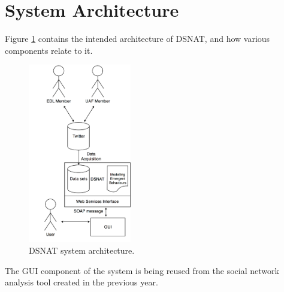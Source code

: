 \section{System Architecture}
Figure \ref{fig:system} contains the intended architecture of DSNAT, and how various components relate to it.

\begin{figure}[htbp]
  \centering
    \includegraphics[width=0.4\textwidth]{./img/system}
  \caption{DSNAT system architecture.}
  \label{fig:system}
\end{figure}

The GUI component of the system is being reused from the social network analysis tool \cite{snat} created in the previous year. 